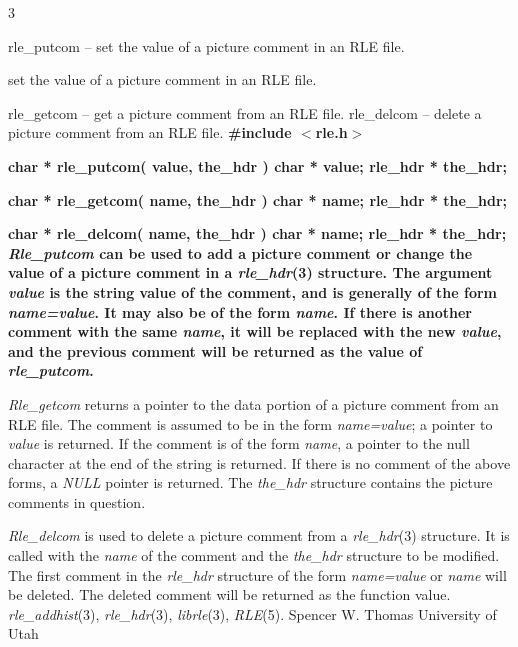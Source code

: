 %
%
%
 3
\begin{TPlist}{rle\_putcom -- set the value of a picture comment in an RLE file.}
\item[{rle\_putcom --}] set the value of a picture comment in an RLE file.
\end{TPlist}\par\noindent
rle\_getcom -- get a picture comment from an RLE file.
\nwl
rle\_delcom -- delete a picture comment from an RLE file.
\bf
\#include $<$rle.h$>$
\par\vspace{1.0\baselineskip}
\bf
char * rle\_putcom( value, the\_hdr )
\nwl
\bf
char * value;
\nwl
\bf
rle\_hdr * the\_hdr;
\par\vspace{1.0\baselineskip}
\bf
char * rle\_getcom( name, the\_hdr )
\nwl
\bf
char * name;
\nwl
\bf
rle\_hdr * the\_hdr;
\par\vspace{1.0\baselineskip}
\bf
char * rle\_delcom( name, the\_hdr )
\nwl
\bf
char * name;
\nwl
\bf
rle\_hdr * the\_hdr;
{\it Rle\_putcom}
can be used to add a picture comment or change the value of a picture
comment in a
{\it rle\_hdr}{\rm (3)}
structure.  The argument
{\it value}
is the string value of the comment, and is generally of the form
{\it name=value}{\rm .}
It may also be of the form
{\it name}{\rm .}
If there is another comment with the same
{\it name}{\rm ,}
it will be replaced with the new 
{\it value}{\rm ,}
and the previous comment will be returned as the value of
{\it rle\_putcom}{\rm .}

{\it Rle\_getcom}
returns a pointer to the data portion of a picture comment from an RLE file.
The comment is assumed to be in the form
{\it name=value}{\rm ;}
a pointer to 
{\it value}
is returned.  If the comment is of the form
{\it name}{\rm ,}
a pointer to the null character at the end of the string is returned.
If there is no comment of the above forms, a
{\it NULL}
pointer is returned.
The
{\it the\_hdr}
structure contains the picture comments in question.

{\it Rle\_delcom}
is used to delete a picture comment from a
{\it rle\_hdr}{\rm (3)}
structure.  It is called with the
{\it name}
of the comment and the
{\it the\_hdr}
structure to be modified.  The first comment in the 
{\it rle\_hdr}
structure of the form
{\it name=value}
or
{\it name}
will be deleted.  The deleted comment will be returned as the function
value.
{\it rle\_addhist}{\rm (3),}
{\it rle\_hdr}{\rm (3),}
{\it librle}{\rm (3),}
{\it RLE}{\rm (5).}
Spencer W. Thomas
\nwl
University of Utah
\newpage


